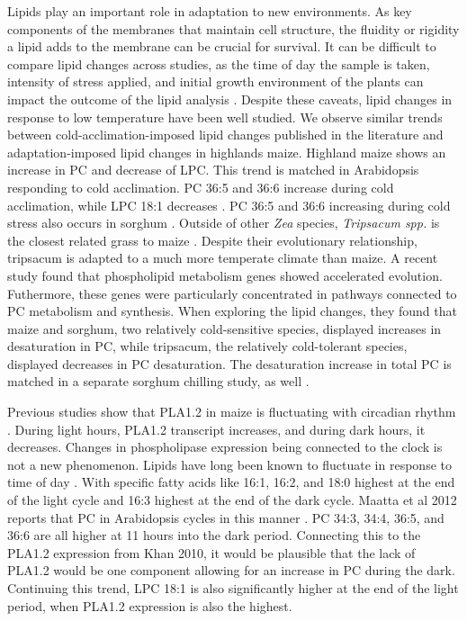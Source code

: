 \documentclass[9pt,twocolumn,twoside]{BioRxiv}
\begin{document}
Lipids play an important role in adaptation to new environments. As key components of the membranes that maintain cell structure, the fluidity or rigidity a lipid adds to the membrane can be crucial for survival. It can be difficult to compare lipid changes across studies, as the time of day the sample is taken, intensity of stress applied, and initial growth environment of the plants can impact the outcome of the lipid analysis \cite{Kenchanmane_Raju2018-nz}. Despite these caveats, lipid changes in response to low temperature have been well studied. We observe similar trends between cold-acclimation-imposed lipid changes published in the literature and adaptation-imposed lipid changes in highlands maize. Highland maize shows an increase in PC and decrease of LPC. This trend is matched in Arabidopsis responding to cold acclimation. PC 36:5 and 36:6 increase during cold acclimation, while LPC 18:1 decreases \cite{Welti2002-uk}. PC 36:5 and 36:6 increasing during cold stress also occurs in sorghum \cite{Marla2017-ph}. 
Outside of other \textit{Zea} species, \textit{Tripsacum spp.} is the closest related grass to maize \cite{Yang2013-lg}. Despite their evolutionary relationship, tripsacum is adapted to a much more temperate climate than maize. A recent study found that phospholipid metabolism genes showed accelerated evolution\cite{Yang2013-lg}. Futhermore, these genes were particularly concentrated in pathways connected to PC metabolism and synthesis. When exploring the lipid changes, they found that maize and sorghum, two relatively cold-sensitive species, displayed increases in desaturation in PC, while tripsacum, the relatively cold-tolerant species, displayed decreases in PC desaturation. The desaturation increase in total PC is matched in a separate sorghum chilling study, as well \cite{Marla2017-ph}. 

Previous studies show that PLA1.2 in maize is fluctuating with circadian rhythm \cite{Khan2010-iv}. During light hours, PLA1.2 transcript increases, and during dark hours, it decreases. Changes in phospholipase expression being connected to the clock is not a new phenomenon. Lipids have long been known to fluctuate in response to time of day \cite{Browse1981-vt, Ekman2007-xe}. With specific fatty acids like 16:1, 16:2, and 18:0 highest at the end of the light cycle and 16:3 highest at the end of the dark cycle. Maatta et al 2012 reports that PC in Arabidopsis cycles in this manner \cite{Maatta2012-ip}. PC 34:3, 34:4, 36:5, and 36:6 are all higher at 11 hours into the dark period. Connecting this to the PLA1.2 expression from Khan 2010, it would be plausible that the lack of PLA1.2 would be one component allowing for an increase in PC during the dark. Continuing this trend, LPC 18:1 is also significantly higher at the end of the light period, when PLA1.2 expression is also the highest. 
\end{document}

